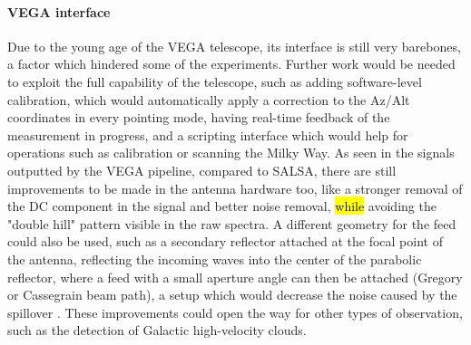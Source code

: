 \paragraph{VEGA interface}
Due to the young age of the VEGA telescope, its interface is still very barebones, a factor which hindered some of the experiments. Further work would be needed to exploit the full capability of the telescope, such as adding software-level calibration, which would automatically apply a correction to the Az/Alt coordinates in every pointing mode, having real-time feedback of the measurement in progress, and a scripting interface which would help for operations such as calibration or scanning the Milky Way. As seen in the signals outputted by the VEGA pipeline, compared to SALSA, there are still improvements to be made in the antenna hardware too, like a stronger removal of the DC component in the signal and better noise removal, \hl{while} avoiding the "double hill" pattern visible in the raw spectra. 
A different geometry for the feed could also be used, such as a secondary reflector attached at the focal point of the antenna, reflecting the incoming waves into the center of the parabolic reflector, where a feed with a small aperture angle can then be attached (Gregory or Cassegrain
beam path), a setup which would decrease the noise caused by the spillover \cite{lauterbach_radio_2022}.
These improvements could open the way for other types of observation, such as the detection of Galactic high-velocity clouds. 


